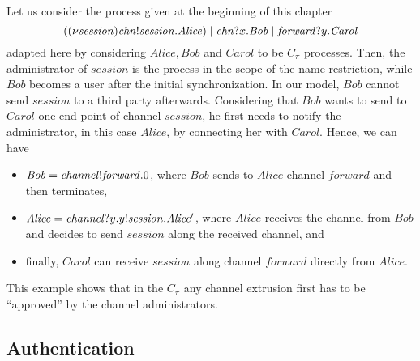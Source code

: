 Let us consider the process given at the beginning of this chapter 
\[
((\nu \mathit{session})\mathit{chn}!\mathit{session}.\mathit{Alice}) \;|\; \mathit{chn}?x.\mathit{Bob} \;|\; \mathit{forward}?y.\mathit{Carol}
\]
adapted here by considering $\mathit{Alice}, \mathit{Bob}$ and $\mathit{Carol}$ to be $C_\pi$ processes.
Then, the administrator of $\mathit{session}$ is the process in the scope of the name restriction, while $\mathit{Bob}$ becomes a user after the initial synchronization. 
In our model, $\mathit{Bob}$ cannot send $\mathit{session}$ to a third party afterwards. 
Considering that $\mathit{Bob}$ wants to send to $\mathit{Carol}$ one end-point of channel $\mathit{session}$, he first needs to notify the administrator, in this case $\mathit{Alice}$, by connecting her with $\mathit{Carol}$.  
Hence, we can have 
\begin{itemize}
\item $\mathit{Bob}=\mathit{channel}!\mathit{forward}.0$, where $\mathit{Bob}$ sends to $\mathit{Alice}$ channel $\mathit{forward}$ and then terminates,
\item $\mathit{Alice}=\mathit{channel}?y.y!\mathit{session}.\mathit{Alice'}$, where $\mathit{Alice}$ receives the channel from $\mathit{Bob}$ and decides to send $\mathit{session}$ along the received channel, and
\item finally, $\mathit{Carol}$ can receive $\mathit{session}$ along channel $\mathit{forward}$ directly from $\mathit{Alice}$.
\end{itemize} 
This example shows that in the $C_\pi$ any channel extrusion first has to be ``approved'' by the channel administrators. 



\subsection{Authentication}\label{sec:authentication}

